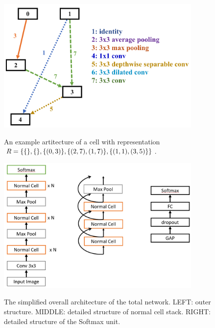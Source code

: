 \documentclass{article}
\begin{document}
\begin{normalsize}
   \begin{figure}[H]
     \centering
     \begin{minipage}[t]{0.45\linewidth}
       \centering
       \includegraphics[width=0.9\textwidth]{figures/cellStruct.png}
    \caption{An example artitecture of a cell with representation $R=\{\{\}, \{\}, \{(0,3)\}, \{(2,7), (1,7)\}, \\ \{(1,1), (3,5)\}\}$.}\label{fig:digit}
    \label{f_artc}
     \end{minipage}
     \hfill
     \begin{minipage}[t]{0.5\linewidth}
       \centering
       \includegraphics[width=0.9\textwidth]{figures/new_architecture.png}
    \caption{The simplified overall architecture of the total network. LEFT: outer structure. MIDDLE: detailed structure of normal cell stack. RIGHT: detailed structure of the Softmax unit.}\label{fig:digit}
    \label{total_artc}
     \end{minipage}
   \end{figure}



\end{normalsize}
\end{document}

